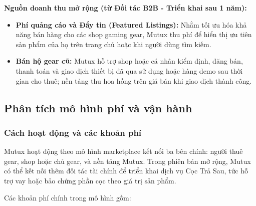 \textbf{Nguồn doanh thu mở rộng (từ Đối tác B2B - Triển khai sau 1 năm):}
\begin{itemize}
    \item \textbf{Phí quảng cáo và Đẩy tin (Featured Listings):} Nhằm tối ưu hóa khả năng bán hàng cho các shop gaming gear, Mutux thu phí để hiển thị ưu tiên sản phẩm của họ trên trang chủ hoặc khi người dùng tìm kiếm. 
    \item \textbf{Bán hộ gear cũ:} Mutux hỗ trợ shop hoặc cá nhân kiểm định, đăng bán, thanh toán và giao dịch thiết bị đã qua sử dụng hoặc hàng demo sau thời gian cho thuê; nền tảng thu hoa hồng trên giá bán khi giao dịch thành công.
\end{itemize}




\subsection{Phân tích mô hình phí và vận hành}

\subsubsection{Cách hoạt động và các khoản phí}

Mutux hoạt động theo mô hình marketplace kết nối ba bên chính: người thuê gear, shop hoặc chủ gear, và nền tảng Mutux. Trong phiên bản mở rộng, Mutux có thể kết nối thêm đối tác tài chính để triển khai dịch vụ Cọc Trả Sau, tức hỗ trợ vay hoặc bảo chứng phần cọc theo giá trị sản phẩm.

Các khoản phí chính trong mô hình gồm:

